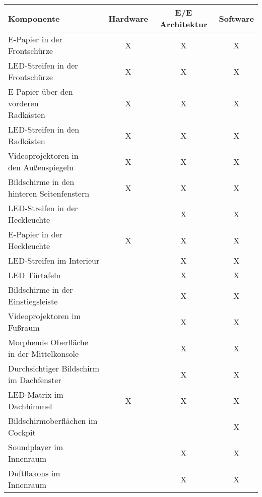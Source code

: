 \begin{table}[hbt]	
	\centering
	\renewcommand{\arraystretch}{1.5}	%
	\label{tab:Entwicklung}
	\begin{tabular}{l|ccc}
		\textbf{Komponente} & \textbf{Hardware} & \textbf{E/E Architektur} & \textbf{Software} \\ 
		\hline 
		\hline 
		\parbox[t]{0.4\linewidth}{\RaggedRight E-Papier in der Frontschürze} & X & X & X \\
		\parbox[t]{0.4\linewidth}{\RaggedRight LED-Streifen in der Frontschürze} & X & X & X \\
		\parbox[t]{0.4\linewidth}{\RaggedRight E-Papier über den vorderen\\ Radkästen} & X & X & X \\
		\parbox[t]{0.4\linewidth}{\RaggedRight LED-Streifen in den Radkästen} & X & X & X \\
		\parbox[t]{0.4\linewidth}{\RaggedRight Videoprojektoren in\\den Außenspiegeln} & X & X & X \\
		\parbox[t]{0.4\linewidth}{\RaggedRight Bildschirme in den\\hinteren Seitenfenstern} & X & X & X \\
		\parbox[t]{0.4\linewidth}{\RaggedRight LED-Streifen in der Heckleuchte} &  & X & X \\
		\parbox[t]{0.4\linewidth}{\RaggedRight E-Papier in der Heckleuchte} & X & X & X \\
		\parbox[t]{0.4\linewidth}{\RaggedRight LED-Streifen im Interieur} &  & X & X \\
		\parbox[t]{0.4\linewidth}{\RaggedRight LED Türtafeln} &  & X & X \\
		\parbox[t]{0.4\linewidth}{\RaggedRight Bildschirme in der Einstiegsleiste} &  & X & X \\
		\parbox[t]{0.4\linewidth}{\RaggedRight Videoprojektoren im Fußraum} &  & X & X \\
		\parbox[t]{0.4\linewidth}{\RaggedRight Morphende Oberfläche\\in der Mittelkonsole} &  & X & X \\
		\parbox[t]{0.4\linewidth}{\RaggedRight Durchsichtiger Bildschirm\\im Dachfenster} &  & X & X \\
		LED-Matrix im Dachhimmel & X & X & X \\
		\parbox[t]{0.4\linewidth}{\RaggedRight Bildschirmoberflächen im Cockpit} &  &  & X \\
		\parbox[t]{0.4\linewidth}{\RaggedRight Soundplayer im Innenraum} &  & X & X \\
		\parbox[t]{0.4\linewidth}{\RaggedRight Duftflakons im Innenraum} &  & X & X \\
	\end{tabular} 
\end{table}

